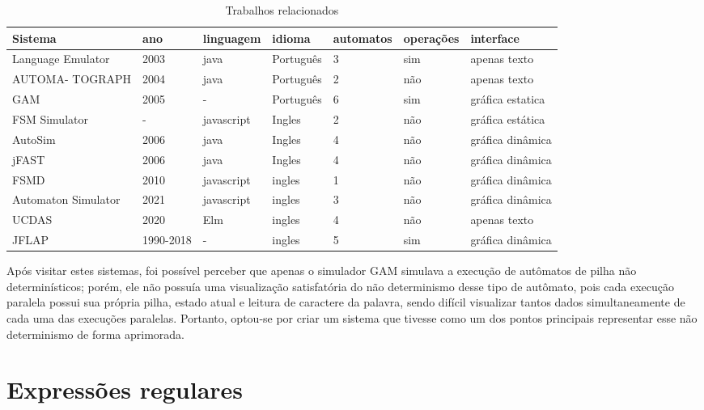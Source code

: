 \renewcommand{\arraystretch}{1.5}
\begin{table}
    \centering
    \begin{tabularx}{\textwidth}{|X|X|X|X|X|X|X|}
        \hline
        \rowcolor{lightgray}
         Sistema& ano&  linguagem&  idioma&  automatos&  operações& interface\\\hline
         Language Emulator&  2003&  java&  Português&  3&  sim& apenas texto\\\hline
         AUTOMA- TOGRAPH&  2004&  java&  Português&  2&  não& apenas texto\\\hline
         GAM&  2005&  -&  Português&  6&  sim& gráfica estatica\\\hline
         FSM Simulator&  -&  javascript&  Ingles&  2&  não& gráfica estática\\\hline
         AutoSim&  2006&  java&  Ingles&  4&  não& gráfica dinâmica\\\hline
         jFAST&  2006&  java&  Ingles& 4 &  não& gráfica dinâmica\\\hline
         FSMD&  2010&  javascript&  ingles&  1&  não& gráfica dinâmica\\\hline
         Automaton Simulator&  2021&  javascript&  ingles&  3&  não& gráfica dinâmica\\\hline
         UCDAS&  2020&  Elm&  ingles&  4&  não& apenas texto\\\hline
         JFLAP&  1990-2018&  -&  ingles&  5&  sim& gráfica dinâmica\\\hline
    \end{tabularx}
    \caption{Trabalhos relacionados}
    \label{tab:comparação de sistemas}
\end{table}

Após visitar estes sistemas, foi possível perceber que apenas o simulador GAM simulava a execução de autômatos de pilha não determinísticos; porém, ele não possuía uma visualização satisfatória do não determinismo desse tipo de autômato, pois cada execução paralela possui sua própria pilha, estado atual e leitura de caractere da palavra, sendo difícil visualizar tantos dados simultaneamente de cada uma das execuções paralelas. Portanto, optou-se por criar um sistema que tivesse como um dos pontos principais representar esse não determinismo de forma aprimorada.


\section{Expressões regulares}

